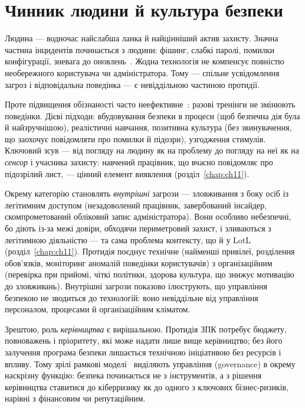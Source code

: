 \section{Чинник людини й культура безпеки}\label{sec:ch17-people}

Людина --- водночас найслабша ланка й найцінніший актив захисту. Значна частина інцидентів починається з людини: фішинг, слабкі паролі, помилки конфігурації, зневага до оновлень~\cite{ch17:verizon}. Жодна технологія не компенсує повністю необережного користувача чи адміністратора. Тому  --- спільне усвідомлення загроз і відповідальна поведінка --- є невіддільною частиною протидії.

Проте підвищення обізнаності часто неефективне~\cite{ch17:awareness}: разові тренінги не змінюють поведінки. Дієві підходи: вбудовування безпеки в процеси (щоб безпечна дія була й найзручнішою), реалістичні навчання, позитивна культура (без звинувачення, що заохочує повідомляти про помилки й підозри), узгодження стимулів. Ключовий зсув --- від погляду на людину як на проблему до погляду на неї як на \emph{сенсор} і учасника захисту: навчений працівник, що вчасно повідомляє про підозрілий лист, --- цінний елемент виявлення (розділ~\ref{chap:ch11}).

Окрему категорію становлять \emph{внутрішні} загрози --- зловживання з боку осіб із легітимним доступом (незадоволений працівник, завербований інсайдер, скомпрометований обліковий запис адміністратора). Вони особливо небезпечні, бо діють із-за межі довіри, обходячи периметровий захист, і зливаються з легітимною діяльністю --- та сама проблема контексту, що й у LotL (розділ~\ref{chap:ch11}). Протидія поєднує технічне (найменші привілеї, розділення обов'язків, моніторинг аномалій поведінки користувачів) з організаційним (перевірка при прийомі, чіткі політики, здорова культура, що знижує мотивацію до зловживань). Внутрішні загрози показово ілюструють, що управління безпекою не зводиться до технологій: воно невіддільне від управління персоналом, процесами й організаційним кліматом.

Зрештою, роль \emph{керівництва} є вирішальною. Протидія ЗПК потребує бюджету, повноважень і пріоритету, які може надати лише вище керівництво; без його залучення програма безпеки лишається технічною ініціативою без ресурсів і впливу. Тому зрілі рамкові моделі~\cite{nist-csf2} виділяють управління (governance) в окрему наскрізну функцію: безпека починається не з інструментів, а з рішення керівництва ставитися до кіберризику як до одного з ключових бізнес-ризиків, нарівні з фінансовим чи репутаційним.


